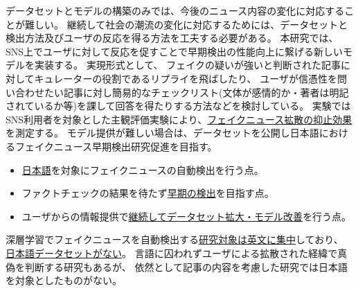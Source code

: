 データセットとモデルの構築のみでは、今後のニュース内容の変化に対応することが難しい。
継続して社会の潮流の変化に対応するためには、データセットと検出方法及びユーザの反応を得る方法を工夫する必要がある。
本研究では、SNS上でユーザに対して反応を促すことで早期検出の性能向上に繋げる新しいモデルを実装する。
実現形式として、
フェイクの疑いが強いと判断された記事に対してキュレーターの役割であるリプライを飛ばしたり、
ユーザが信憑性を問い合わせたい記事に対し簡易的なチェックリスト(文体が感情的か・著者は明記されているか等)を課して回答を得たりする方法などを検討している。
実験ではSNS利用者を対象とした主観評価実験により、\underline{フェイクニュース拡散の抑止効果}を測定する。
モデル提供が難しい場合は、データセットを公開し日本語におけるフェイクニュース早期検出研究促進を目指す。



\vspace{20pt}
\begin{itemize}
    \setlength{\parskip}{0cm}
    \setlength{\itemsep}{0cm}
    \item \underline{日本語}を対象にフェイクニュースの自動検出を行う点。
    \item ファクトチェックの結果を待たず\underline{早期の検出}を目指す点。
    \item ユーザからの情報提供で\underline{継続してデータセット拡大・モデル改善}を行う点。
\end{itemize}
\vspace{-10pt}
深層学習でフェイクニュースを自動検出する\underline{研究対象は英文に集中}しており、
\underline{日本語データセットがない}。
言語に囚われずユーザによる拡散された経緯で真偽を判断する研究もあるが\cite{tarek2020}、
依然として記事の内容を考慮した研究では日本語を対象としたものがない。

